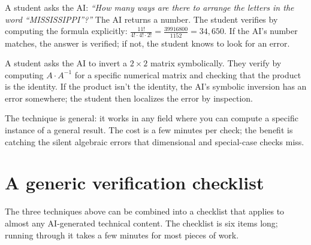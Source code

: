 \documentclass[11pt]{book}
\begin{document}
\begin{example}
A student asks the AI: \emph{``How many ways are there to arrange the letters in the word ``MISSISSIPPI''?''} The AI returns a number. The student verifies by computing the formula explicitly: $\frac{11!}{4! \cdot 4! \cdot 2!} = \frac{39916800}{1152} = 34{,}650$. If the AI's number matches, the answer is verified; if not, the student knows to look for an error.
\end{example}

\begin{example}
A student asks the AI to invert a $2 \times 2$ matrix symbolically. They verify by computing $A \cdot A^{-1}$ for a specific numerical matrix and checking that the product is the identity. If the product isn't the identity, the AI's symbolic inversion has an error somewhere; the student then localizes the error by inspection.
\end{example}

The technique is general: it works in any field where you can compute a specific instance of a general result. The cost is a few minutes per check; the benefit is catching the silent algebraic errors that dimensional and special-case checks miss.

\section{A generic verification checklist}

The three techniques above can be combined into a checklist that applies to almost any AI-generated technical content. The checklist is six items long; running through it takes a few minutes for most pieces of work.
\end{document}
